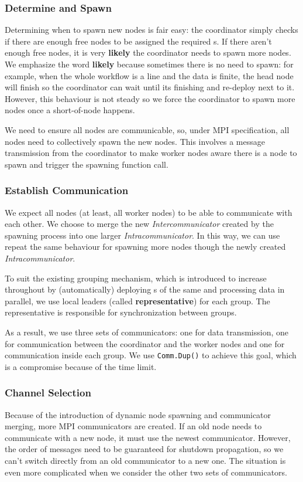 \subsubsection{Determine and Spawn}
Determining when to spawn new nodes is fair easy: the coordinator simply checks if there are enough free nodes to be assigned the required \tPEInst{}s. If there aren't enough free nodes, it is very \textbf{likely} the coordinator needs to spawn more nodes. We emphasize the word \textbf{likely} because sometimes there is no need to spawn: for example, when the whole workflow is a line and the data is finite, the head node will finish so the coordinator can wait until its finishing and re-deploy next \tPEInst to it. However, this behaviour is not steady so we force the coordinator to spawn more nodes once a short-of-node happens.

We need to ensure all nodes are communicable, so, under MPI specification, all nodes need to collectively spawn the new nodes. This involves a message transmission from the coordinator to make worker nodes aware there is a node to spawn and trigger the spawning function call.

\subsubsection{Establish Communication}
We expect all nodes (at least, all worker nodes) to be able to communicate with each other. We choose to merge the new \emph{Intercommunicator} created by the spawning process into one larger \emph{Intracommunicator}. In this way, we can use repeat the same behaviour for spawning more nodes though the newly created \emph{Intracommunicator}.

To suit the existing grouping mechanism, which is introduced to increase throughout by (automatically) deploying \tPEDup{}s of the same \tPEInst and processing data in parallel, we use local leaders (called \textbf{representative}) for each group. The representative is responsible for synchronization between groups.

As a result, we use three sets of communicators: one for data transmission, one for communication between the coordinator and the worker nodes and one for communication inside each group. We use \lstinline|Comm.Dup()| to achieve this goal, which is a compromise because of the time limit.

\subsubsection{Channel Selection}
Because of the introduction of dynamic node spawning and communicator merging, more MPI communicators are created. If an old node needs to communicate with a new node, it must use the newest communicator. However, the order of messages need to be guaranteed for shutdown propagation, so we can't switch directly from an old communicator to a new one. The situation is even more complicated when we consider the other two sets of communicators.

